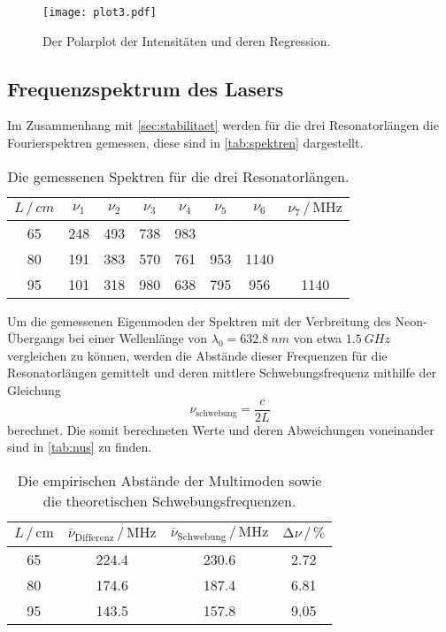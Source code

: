\begin{figure}[H]
    \centering
    \texttt{[image: plot3.pdf]}
    \caption{Der Polarplot der Intensitäten und deren Regression.}
    \label{fig:plot3}
\end{figure}


\subsection{Frequenzspektrum des Lasers} \label{sec:spektrum}
Im Zusammenhang mit \autoref{sec:stabilitaet} werden für die drei Resonatorlängen die Fourierspektren gemessen,
diese sind in \autoref{tab:spektren} dargestellt.
\begin{table}
    \centering
    \caption{Die gemessenen Spektren für die drei Resonatorlängen.}
    \label{tab:spektren}
    \begin{tabular}{c c c c c c c c}
        \toprule
        $L \, / \, cm$ & $\nu_1$ & $\nu_2$ & $\nu_3$ & $\nu_4$ & $\nu_5$ & $\nu_6$ & $\nu_7  \, / \, \unit{\mega\hertz}$\\
        \midrule
           65 &  248 &  493 &  738 &  983 &       &        &        \\
           80 &  191 &  383 &  570 &  761 & 953 & 1140 &        \\
           95 &  101 &  318 &  980 &  638 & 795 &  956 & 1140 \\
        \bottomrule
    \end{tabular}
\end{table}

Um die gemessenen Eigenmoden der Spektren mit der Verbreitung des Neon-Übergangs bei einer Wellenlänge von $\lambda_0 = \qty{632.8}{nm}$ von etwa $\qty{1.5}{GHz}$ vergleichen zu können,
werden die Abstände dieser Frequenzen für die Resonatorlängen gemittelt und deren mittlere Schwebungsfrequenz mithilfe der Gleichung
\begin{equation*}
    \nu_{\text{schwebung}} = \frac{c}{2L} 
\end{equation*}
berechnet. Die somit berechneten Werte und deren Abweichungen voneinander sind in \autoref{tab:nus} zu finden.
\begin{table}
    \centering
    \caption{Die empirischen Abstände der Multimoden sowie die theoretischen Schwebungsfrequenzen.}
    \label{tab:nus}
    \begin{tabular}{c c c c}
        \toprule
        $L \, / \, \mathrm{cm}$ & 
        $\bar{\nu}_\text{Differenz} \, / \, \unit{\mega\hertz}$ & 
        $\bar{\nu}_{\text{Schwebung}} \, / \, \unit{\mega\hertz}$ &
        $\increment \nu  \, / \, \unit{\percent}$ \\
        \midrule
           65 & 224.4 &  230.6 & 2.72 \\
           80 & 174.6 &  187.4 & 6.81 \\ 
           95 & 143.5 &  157.8 & 9.05 \\
        \bottomrule
    \end{tabular}
\end{table}


